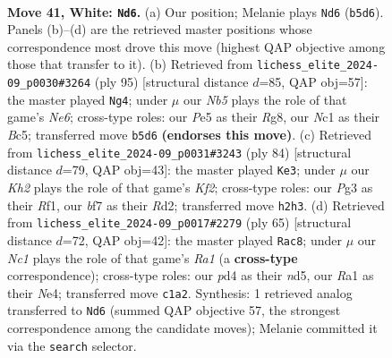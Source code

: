 \documentclass[11pt]{article}
\begin{document}
\clearpage

\begin{figure}[p]\centering
\begin{subfigure}{0.46\textwidth}\centering
\resizebox{\linewidth}{!}{%
\newchessgame
\chessboard[
  setfen={r2b2r1/1p3b1p/n1k3pP/pN2Pp2/P2p4/3R2P1/1B5K/R1N5 w - - 6 41},
  showmover=false,
  pgfstyle=straightmove, color=movearrow, markmove={b5-d6}
]}
\caption{}
\end{subfigure}\hfill
\begin{subfigure}{0.46\textwidth}\centering
\resizebox{\linewidth}{!}{%
\newchessgame
\chessboard[
  setfen={6rk/r4p2/P1B1p2p/2b1P2p/2P2P2/3pn2K/R2B4/2R5 b - - 11 48},
  showmover=false,
  pgfstyle=straightmove, color=movearrow, markmove={e3-g4}
]}
\caption{}
\end{subfigure}
\\[4pt]
\begin{subfigure}{0.46\textwidth}\centering
\resizebox{\linewidth}{!}{%
\newchessgame
\chessboard[
  setfen={1r1r1bk1/5p2/3Pb2p/4PNpP/6P1/p2B4/p2R1K2/5R2 w - - 0 43},
  showmover=false,
  pgfstyle=straightmove, color=movearrow, markmove={f2-e3}
]}
\caption{}
\end{subfigure}\hfill
\begin{subfigure}{0.46\textwidth}\centering
\resizebox{\linewidth}{!}{%
\newchessgame
\chessboard[
  setfen={r2r1b2/5ppk/7p/3Np3/p3n1P1/P2R1b1P/1PR2P2/2B2BK1 b - - 18 33},
  showmover=false,
  pgfstyle=straightmove, color=movearrow, markmove={a8-c8}
]}
\caption{}
\end{subfigure}
\caption{\textbf{Move 41, White: \texttt{Nd6}.} (a) Our position; Melanie plays \texttt{Nd6} (\texttt{b5d6}). Panels (b)--(d) are the retrieved master positions whose correspondence most drove this move (highest QAP objective among those that transfer to it). (b) Retrieved from \texttt{lichess\_elite\_2024-09\_p0030\#3264} (ply 95) [structural distance $d$=85, QAP obj=57]: the master played \texttt{Ng4}; under $\mu$ our \emph{Nb5} plays the role of that game's \emph{Ne6}; cross-type roles: our \emph{P}e5 as their \emph{R}g8, our \emph{N}c1 as their \emph{B}c5; transferred move \texttt{b5d6} \textbf{(endorses this move)}. (c) Retrieved from \texttt{lichess\_elite\_2024-09\_p0031\#3243} (ply 84) [structural distance $d$=79, QAP obj=43]: the master played \texttt{Ke3}; under $\mu$ our \emph{Kh2} plays the role of that game's \emph{Kf2}; cross-type roles: our \emph{P}g3 as their \emph{R}f1, our \emph{b}f7 as their \emph{R}d2; transferred move \texttt{h2h3}. (d) Retrieved from \texttt{lichess\_elite\_2024-09\_p0017\#2279} (ply 65) [structural distance $d$=72, QAP obj=42]: the master played \texttt{Rac8}; under $\mu$ our \emph{Nc1} plays the role of that game's \emph{Ra1} (a \textbf{cross-type} correspondence); cross-type roles: our \emph{p}d4 as their \emph{n}d5, our \emph{R}a1 as their \emph{N}e4; transferred move \texttt{c1a2}. Synthesis: 1 retrieved analog transferred to \texttt{Nd6} (summed QAP objective 57, the strongest correspondence among the candidate moves); Melanie committed it via the \texttt{search} selector.}
\label{fig:thought-m80}
\end{figure}
\end{document}
